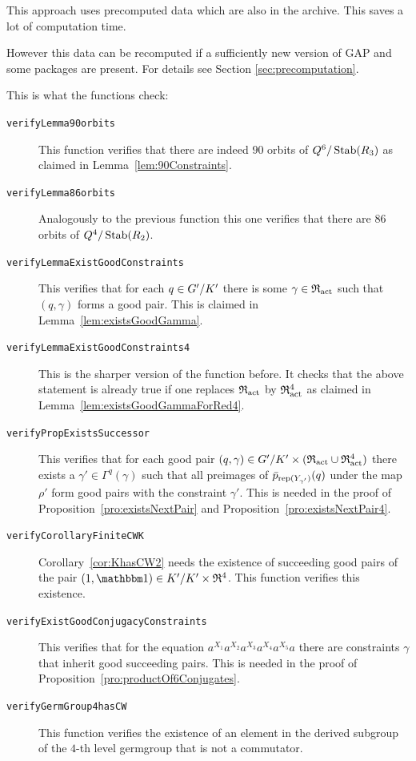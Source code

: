 \documentclass[a4paper,11pt]{amsart}
\begin{document}
This approach uses precomputed data which are also in the archive. This saves a lot of
computation time.

However this data can be recomputed if a sufficiently new version of GAP and
some packages are present. For details see Section \ref{sec:precomputation}.

This is what the functions check:
\begin{description}
\item[\texttt{verifyLemma90orbits}] This function verifies that there are
  indeed $90$ orbits of ${Q^6/\operatorname{Stab}(R_3)}$ as claimed in Lemma~\ref{lem:90Constraints}. 
\item[\texttt{verifyLemma86orbits}] Analogously to the previous function 
  this one verifies that there are $86$ orbits of ${Q^4/\operatorname{Stab}(R_2)}$. 
\item[\texttt{verifyLemmaExistGoodConstraints}] This verifies that for each 
  $q\in{G'/K'}$ there is some $\gamma\in\mathfrak{R}_{\operatorname{act}}$ such that $(q,\gamma)$ 
  forms a good pair. This is claimed in Lemma~\ref{lem:existsGoodGamma}.
\item[\texttt{verifyLemmaExistGoodConstraints4}] This is the sharper version
  of the function before. It checks that the above statement is already true 
  if one replaces $\mathfrak{R}_{\operatorname{act}}$ by $\mathfrak{R}_{\operatorname{act}}^4$ as claimed in 
  Lemma~\ref{lem:existsGoodGammaForRed4}.
\item[\texttt{verifyPropExistsSuccessor}] This verifies that for
  each good pair $(q,\gamma) \in{G'/K'}\times(\mathfrak{R}_{\operatorname{act}}\cup \mathfrak{R}_{\operatorname{act}}^4)$ there exists 
  a $\gamma'\in\Gamma^q(\gamma)$ such that all preimages of 
  $\bar p_{\operatorname{rep}(Y_{\gamma'})}(q)$ under the map $\rho'$ form
  good pairs with the constraint $\gamma'$. This is needed in the proof of
  Proposition~\ref{pro:existsNextPair} and Proposition~\ref{pro:existsNextPair4}.
\item[\texttt{verifyCorollaryFiniteCWK}] Corollary~\ref{cor:KhasCW2} needs the
  existence of succeeding good pairs of the pair $(1,\id)\in\RNK{K'}{K'}\times\Red^4$.
  This function verifies this existence. 
\item[\texttt{verifyExistGoodConjugacyConstraints}] This verifies that for the equation
  $a^{X_1}a^{X_2}a^{X_3}a^{X_4}a^{X_5}a$ there are constraints $\gamma$ 
  that inherit good succeeding pairs. This is needed in the proof of
  Proposition~\ref{pro:productOf6Conjugates}.
\item[\texttt{verifyGermGroup4hasCW}] This function verifies the existence of 
  an element in the derived subgroup of the $4$-th level germgroup that is not a commutator.
\end{description}
\end{document}
